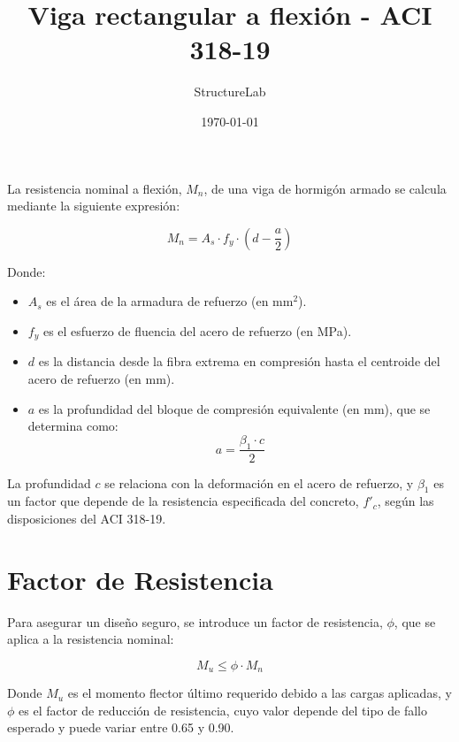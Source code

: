 \documentclass[a4paper,spanish,10pt]{article}%
\title{Viga rectangular a flexión {-} ACI 318{-}19}%
\author{StructureLab}%
\date{\today}%
\begin{document}
%
\normalsize%
\maketitle%

        La resistencia nominal a flexión, $M_n$, de una viga de hormigón armado se calcula mediante la siguiente expresión:

        \begin{equation}
        M_n = A_s \cdot f_y \cdot \left( d - \frac{a}{2} \right)
        \end{equation}

        Donde:

        \begin{itemize}
            \item $A_s$ es el área de la armadura de refuerzo (en $\text{mm}^2$).
            \item $f_y$ es el esfuerzo de fluencia del acero de refuerzo (en MPa).
            \item $d$ es la distancia desde la fibra extrema en compresión hasta el centroide del acero de refuerzo (en mm).
            \item $a$ es la profundidad del bloque de compresión equivalente (en mm), que se determina como:
            \begin{equation}
            a = \frac{\beta_1 \cdot c}{2}
            \end{equation}
        \end{itemize}

        La profundidad $c$ se relaciona con la deformación en el acero de refuerzo, y $\beta_1$ es un factor que depende de la resistencia especificada del concreto, $f'_c$, según las disposiciones del ACI 318-19.

        \section{Factor de Resistencia}

        Para asegurar un diseño seguro, se introduce un factor de resistencia, $\phi$, que se aplica a la resistencia nominal:

        \begin{equation}
        M_u \leq \phi \cdot M_n
        \end{equation}

        Donde $M_u$ es el momento flector último requerido debido a las cargas aplicadas, y $\phi$ es el factor de reducción de resistencia, cuyo valor depende del tipo de fallo esperado y puede variar entre 0.65 y 0.90.

\end{document}
